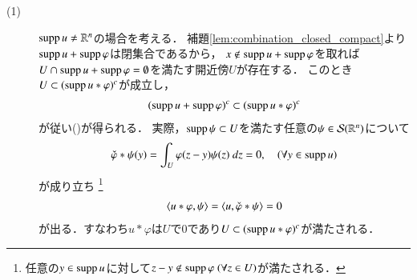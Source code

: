 	\begin{prf}\mbox{}
		\begin{description}
			\item[(1)]
				$\operatorname{supp} u \neq \mathbb{R}^n$の場合を考える．
				補題\ref{lem:combination_closed_compact}より$\operatorname{supp} u + \operatorname{supp} \varphi$は閉集合であるから，
				$x \notin \operatorname{supp} u+\operatorname{supp} \varphi$を取れば
				$U \cap \operatorname{supp} u+\operatorname{supp} \varphi = \emptyset$を満たす開近傍$U$が存在する．
				このとき$U \subset (\operatorname{supp} u \ast \varphi)^c$が成立し，
				\begin{align}
					(\operatorname{supp} u + \operatorname{supp} \varphi)^c \subset (\operatorname{supp} u \ast \varphi)^c
				\end{align}
				が従い()が得られる．
				実際，$\operatorname{supp} \psi \subset U$を満たす任意の$\psi \in \mathcal{S}(\mathbb{R}^n)$について
				\begin{align}
					\check{\varphi} \ast \psi (y)
					= \int_{U} \varphi(z - y)\psi(z)\ dz
					= 0,
					\quad (\forall y \in \operatorname{supp} u)
				\end{align}
				が成り立ち
				\footnote{
					任意の$y \in \operatorname{supp} u$に対して$z - y \notin \operatorname{supp} \varphi\ (\forall z \in U)$が満たされる．
				}
				\begin{align}
					\inprod<u \ast \varphi, \psi>
					= \inprod<u, \check{\varphi} \ast \psi>
					= 0
				\end{align}
				が出る．すなわち$u \ast \varphi$は$U$で0であり$U \subset (\operatorname{supp} u \ast \varphi)^c$が満たされる．
				

\end{description}
\end{prf}
